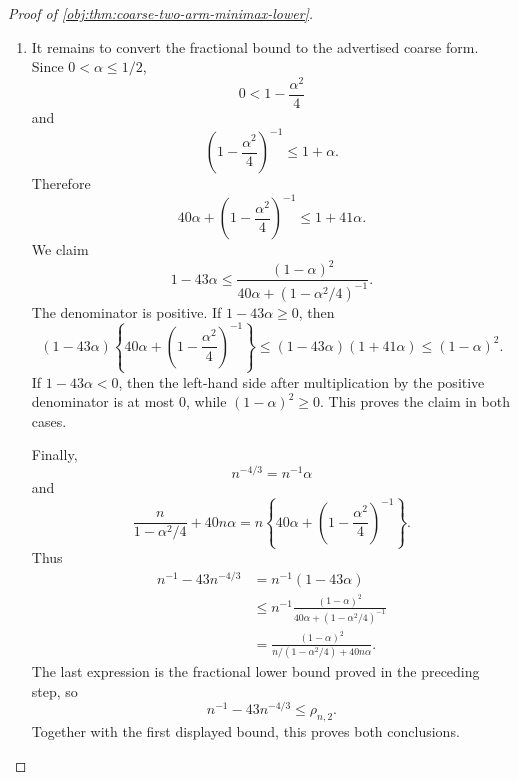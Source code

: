 \begin{proof}[Proof of \cref{obj:thm:coarse-two-arm-minimax-lower}]
\begin{enumerate}
\item It remains to convert the fractional bound to the advertised coarse form. Since \(0<\alpha\le 1/2\),
\[
0<1-\frac{\alpha^2}{4}
\]
and
\[
\left(1-\frac{\alpha^2}{4}\right)^{-1}\le 1+\alpha.
\]
Therefore
\[
40\alpha+\left(1-\frac{\alpha^2}{4}\right)^{-1}
\le
1+41\alpha.
\]
We claim
\[
1-43\alpha
\le
\frac{(1-\alpha)^2}
{40\alpha+(1-\alpha^2/4)^{-1}}.
\]
The denominator is positive. If \(1-43\alpha\ge 0\), then
\[
(1-43\alpha)\left\{40\alpha+\left(1-\frac{\alpha^2}{4}\right)^{-1}\right\}
\le
(1-43\alpha)(1+41\alpha)
\le
(1-\alpha)^2.
\]
If \(1-43\alpha<0\), then the left-hand side after multiplication by the positive denominator is at most \(0\), while \((1-\alpha)^2\ge0\). This proves the claim in both cases.

Finally,
\[
n^{-4/3}=n^{-1}\alpha
\]
and
\[
\frac{n}{1-\alpha^2/4}+40n\alpha
=
n\left\{40\alpha+\left(1-\frac{\alpha^2}{4}\right)^{-1}\right\}.
\]
Thus
\[
\begin{aligned}
n^{-1}-43n^{-4/3}
&=
n^{-1}(1-43\alpha)\\
&\le
n^{-1}
\frac{(1-\alpha)^2}
{40\alpha+(1-\alpha^2/4)^{-1}}\\
&=
\frac{(1-\alpha)^2}
{n/(1-\alpha^2/4)+40n\alpha}.
\end{aligned}
\]
The last expression is the fractional lower bound proved in the preceding step, so
\[
n^{-1}-43n^{-4/3}\le \rho_{n,2}.
\]
Together with the first displayed bound, this proves both conclusions.
\end{enumerate}
\end{proof}

